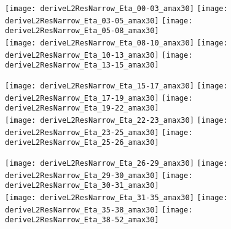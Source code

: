 \documentclass[landscape,10pt]{beamer} %
\begin{document}

\newpage
\begin{figure}[p]
\centering
  \texttt{[image: deriveL2ResNarrow\_Eta\_00-03\_amax30]}
  \texttt{[image: deriveL2ResNarrow\_Eta\_03-05\_amax30]}
  \texttt{[image: deriveL2ResNarrow\_Eta\_05-08\_amax30]}
\\
  \texttt{[image: deriveL2ResNarrow\_Eta\_08-10\_amax30]}
  \texttt{[image: deriveL2ResNarrow\_Eta\_10-13\_amax30]}
  \texttt{[image: deriveL2ResNarrow\_Eta\_13-15\_amax30]}
\end{figure}
\newpage
\begin{figure}[p]
\centering
  \texttt{[image: deriveL2ResNarrow\_Eta\_15-17\_amax30]}
  \texttt{[image: deriveL2ResNarrow\_Eta\_17-19\_amax30]}
  \texttt{[image: deriveL2ResNarrow\_Eta\_19-22\_amax30]}
\\
  \texttt{[image: deriveL2ResNarrow\_Eta\_22-23\_amax30]}
  \texttt{[image: deriveL2ResNarrow\_Eta\_23-25\_amax30]}
  \texttt{[image: deriveL2ResNarrow\_Eta\_25-26\_amax30]}
\end{figure}
\newpage
\begin{figure}[p]
\centering
  \texttt{[image: deriveL2ResNarrow\_Eta\_26-29\_amax30]}
  \texttt{[image: deriveL2ResNarrow\_Eta\_29-30\_amax30]}
  \texttt{[image: deriveL2ResNarrow\_Eta\_30-31\_amax30]}
\\
  \texttt{[image: deriveL2ResNarrow\_Eta\_31-35\_amax30]}
  \texttt{[image: deriveL2ResNarrow\_Eta\_35-38\_amax30]}
  \texttt{[image: deriveL2ResNarrow\_Eta\_38-52\_amax30]}
\end{figure}
\end{document}

